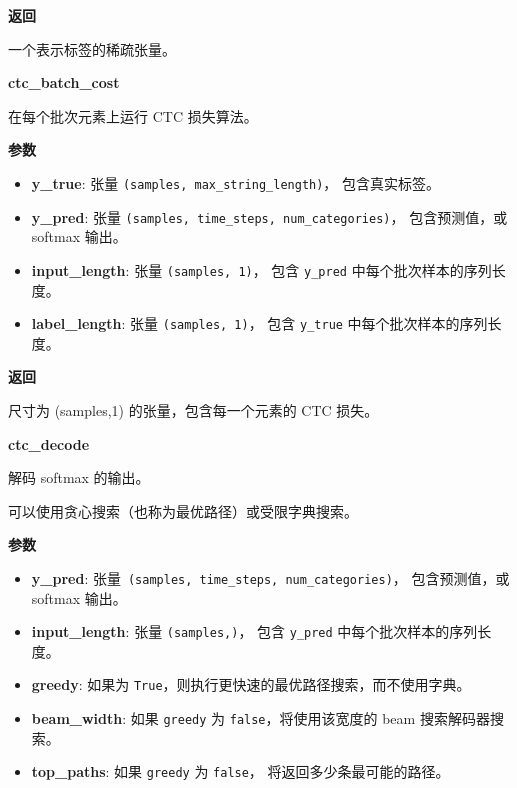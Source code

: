 \textbf{返回}

一个表示标签的稀疏张量。


\textbf{ctc\_batch\_cost}\label{ctcux5fbatchux5fcost}

\begin{Shaded}
\begin{Highlighting}[]
\end{Highlighting}
\end{Shaded}

在每个批次元素上运行 CTC 损失算法。

\textbf{参数}

\begin{itemize}
\tightlist
\item
  \textbf{y\_true}: 张量 \texttt{(samples,\ max\_string\_length)}，
  包含真实标签。
\item
  \textbf{y\_pred}: 张量
  \texttt{(samples,\ time\_steps,\ num\_categories)}， 包含预测值，或
  softmax 输出。
\item
  \textbf{input\_length}: 张量 \texttt{(samples,\ 1)}， 包含
  \texttt{y\_pred} 中每个批次样本的序列长度。
\item
  \textbf{label\_length}: 张量 \texttt{(samples,\ 1)}， 包含
  \texttt{y\_true} 中每个批次样本的序列长度。
\end{itemize}

\textbf{返回}

尺寸为 (samples,1) 的张量，包含每一个元素的 CTC 损失。


\textbf{ctc\_decode}\label{ctcux5fdecode}

\begin{Shaded}
\begin{Highlighting}[]
\OperatorTok{=}\OperatorTok{=}\OperatorTok{=}\NormalTok{)}
\end{Highlighting}
\end{Shaded}

解码 softmax 的输出。

可以使用贪心搜索（也称为最优路径）或受限字典搜索。

\textbf{参数}

\begin{itemize}
\tightlist
\item
  \textbf{y\_pred}:
  张量~\texttt{(samples,\ time\_steps,\ num\_categories)}，
  包含预测值，或 softmax 输出。
\item
  \textbf{input\_length}: 张量 \texttt{(samples,)}， 包含
  \texttt{y\_pred} 中每个批次样本的序列长度。
\item
  \textbf{greedy}: 如果为
  \texttt{True}，则执行更快速的最优路径搜索，而不使用字典。
\item
  \textbf{beam\_width}: 如果 \texttt{greedy} 为
  \texttt{false}，将使用该宽度的 beam 搜索解码器搜索。
\item
  \textbf{top\_paths}: 如果 \texttt{greedy} 为 \texttt{false}，
  将返回多少条最可能的路径。
\end{itemize}

